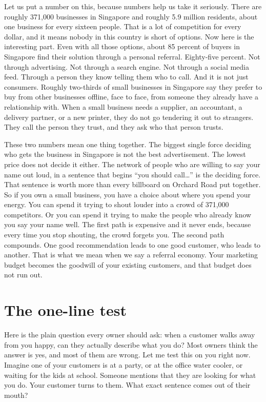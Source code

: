 \documentclass[10pt,twoside,openany]{memoir}
\newcommand{\needspacehead}{\needspace{4\baselineskip}}
\let\oldsection\section
\renewcommand{\section}{\needspacehead\oldsection}
\begin{document}
{Let us put a number on this, because numbers help us take it seriously.
There are roughly 371,000 businesses in Singapore and roughly 5.9
million residents, about one business for every sixteen people. That is
a lot of competition for every dollar, and it means nobody in this
country is short of options. Now here is the interesting part. Even with
all those options, about 85 percent of buyers in Singapore find their
solution through a personal referral. Eighty-five percent. Not through
advertising. Not through a search engine. Not through a social media
feed. Through a person they know telling them who to call. And it is not
just consumers. Roughly two-thirds of small businesses in Singapore say
they prefer to buy from other businesses offline, face to face, from
someone they already have a relationship with. When a small business
needs a supplier, an accountant, a delivery partner, or a new printer,
they do not go tendering it out to strangers. They call the person they
trust, and they ask who that person trusts.

These two numbers mean one thing together. The biggest single force
deciding who gets the business in Singapore is not the best
advertisement. The lowest price does not decide it either. The network
of people who are willing to say your name out loud, in a sentence that
begins ``you should call\ldots{}'' is the deciding force. That sentence
is worth more than every billboard on Orchard Road put together. So if
you own a small business, you have a choice about where you spend your
energy. You can spend it trying to shout louder into a crowd of 371,000
competitors. Or you can spend it trying to make the people who already
know you say your name well. The first path is expensive and it never
ends, because every time you stop shouting, the crowd forgets you. The
second path compounds. One good recommendation leads to one good
customer, who leads to another. That is what we mean when we say a
referral economy. Your marketing budget becomes the goodwill of your
existing customers, and that budget does not run out.

\section{The one-line test}\label{the-one-line-test}

Here is the plain question every owner should ask: when a customer walks
away from you happy, can they actually describe what you do? Most owners
think the answer is yes, and most of them are wrong. Let me test this on
you right now. Imagine one of your customers is at a party, or at the
office water cooler, or waiting for the kids at school. Someone mentions
that they are looking for what you do. Your customer turns to them. What
exact sentence comes out of their mouth?

}
\end{document}

